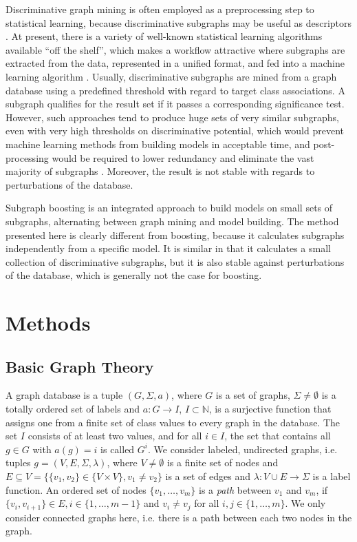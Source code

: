 \documentclass{sig-alternate}
\begin{document}
Discriminative graph mining is often employed as a preprocessing step to
statistical learning, because discriminative subgraphs may be useful as descriptors
\cite{bringmann10lego}. At present, there is a variety of well-known statistical
learning algorithms available ``off the shelf'', which makes a workflow
attractive where subgraphs are extracted from the data, represented in a
unified format, and fed into a machine learning algorithm \cite{KRH01}.
Usually, discriminative subgraphs are mined from a graph database using a
predefined threshold with regard to target class associations. A subgraph
qualifies for the result set if it passes a corresponding significance test.
However, such approaches tend to produce huge sets of very similar subgraphs,
even with very high thresholds on discriminative potential, which would prevent
machine learning methods from building models in acceptable time, and post-processing 
would be required to lower redundancy and eliminate the vast
majority of subgraphs \cite{Jun04Spin}. Moreover, the
result is not stable with regards to perturbations of the database.

Subgraph boosting \cite{saigo09gboost} is an integrated approach to build models on
small sets of subgraphs, alternating between graph mining and model building. The method presented here is clearly
different from boosting, because it calculates subgraphs independently from a specific model. It is similar in that it calculates a small
collection of discriminative subgraphs, but it is also stable against
perturbations of the database, which is generally not the case for boosting.


\section{Methods}
\label{s:Methods}

\subsection{Basic Graph Theory}
\label{ss:BasicGraphTheory}
A graph database is a tuple $(G, \Sigma, a)$, where $G$ is a set of graphs,
$\Sigma \ne \emptyset$  is a totally ordered set of labels and $a: G
\rightarrow I$, $I \subset \mathbb{N}$, is a surjective function that assigns one from a
finite set of class values to every graph in the database. The set 
$I$ consists of at least two values, and for all $i \in I$, the set that contains all $g \in G$
with $a(g)=i$ is called $G^i$. We consider labeled, undirected
graphs, i.e. tuples $g=(V,E,\Sigma,\lambda)$, where $V\ne \emptyset$ is a
finite set of nodes and $E \subseteq V = \{\{v_1, v_2\} \in \{V \times V\}, v_1
\ne v_2\}$ is a set of edges and $\lambda: V\cup E \rightarrow \Sigma$ is a
label function. 
An ordered set of nodes $\{ v_1, \ldots, v_m\}$ is a \emph{path} between $v_1$ and $v_m$, if $\{v_i, v_{i+1}\} \in E, i \in \{1,\ldots,m-1\}$ and $v_i \neq v_j$ for all $i,j\in \{1,\ldots,m\}$.
We only consider connected graphs here, i.e. there is a path
between each two nodes in the graph.
\end{document}

